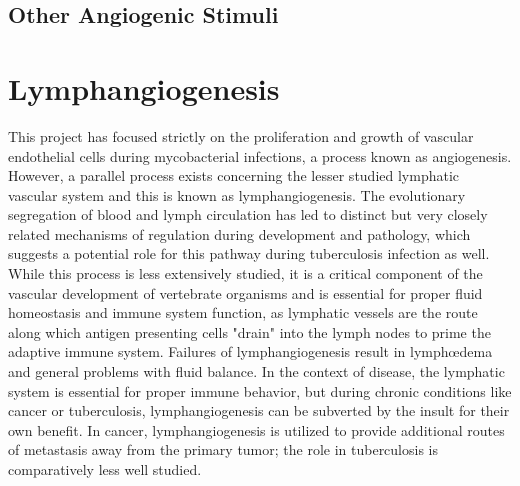 \subsection{Other Angiogenic Stimuli}

\citep{Jeon2007}

\section{Lymphangiogenesis}

This project has focused strictly on the proliferation and growth of vascular endothelial cells during mycobacterial infections, a process known as angiogenesis. However, a parallel process exists concerning the lesser studied lymphatic vascular system and this is known as lymphangiogenesis. The evolutionary segregation of blood and lymph circulation has led to distinct but very closely related mechanisms of regulation during development and pathology, which suggests a potential role for this pathway during tuberculosis infection as well. While this process is less extensively studied, it is a critical component of the vascular development of vertebrate organisms and is essential for proper fluid homeostasis and immune system function, as lymphatic vessels are the route along which antigen presenting cells "drain" into the lymph nodes to prime the adaptive immune system. Failures of lymphangiogenesis result in lymph\oe dema and general problems with fluid balance. In the context of disease, the lymphatic system is essential for proper immune behavior, but during chronic conditions like cancer or tuberculosis, lymphangiogenesis can be subverted by the insult for their own benefit. In cancer, lymphangiogenesis is utilized to provide additional routes of metastasis away from the primary tumor; the role in tuberculosis is comparatively less well studied.

